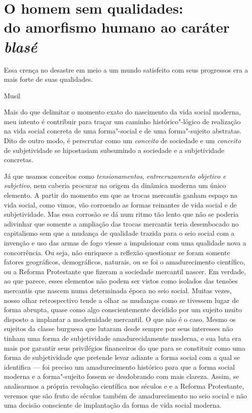\chapter*{O homem sem qualidades:\\ do amorfismo humano ao caráter \emph{blasé}}

\epigraph{Essa crença no desastre em meio a um mundo satisfeito com seus
progressos era a mais forte de suas qualidades.}{Musil}

Mais do que delimitar o momento exato do nascimento da vida social
moderna, meu intento é contribuir para traçar um caminho
histórico"-lógico de realização na vida social concreta de uma forma"-social e de
uma forma"-sujeito abstratas. Dito de outro modo, é perscrutar como um
\emph{conceito} de sociedade e um \emph{conceito} de subjetividade se
hipostasiam subsumindo a sociedade e a subjetividade concretas.

Já que usamos conceitos como \emph{tensionamentos},
\emph{entrecruzamento objetivo e subjetivo}, nem caberia procurar na
origem da dinâmica moderna um único elemento. A partir do momento em que
as trocas mercantis ganham espaço na vida social, como vimos, vão
corroendo as formas reinantes de vida social e de subjetividade. Mas
essa corrosão se dá num ritmo tão lento que não se poderia adivinhar que
somente a ampliação das trocas mercantis teria desembocado no
capitalismo sem que a mudança de qualidade trazida para o seio social
com a invenção e uso das armas de fogo viesse a impulsionar com uma
qualidade nova a concorrência. Ou seja, não enriquece a reflexão questionar
se foram somente fatores geográficos, demográficos, naturais, ou se
foi o amadurecimento científico, ou a Reforma Protestante que fizeram a
sociedade mercantil nascer. Em verdade, ao que parece, esses elementos
não podem ser vistos como isolados das tensões mercantis que nascem numa
determinada época no seio social. Muitas vezes, nosso olhar
retrospectivo tende a olhar as mudanças como se tivessem lugar de forma
abrupta, quase como algo conscientemente decidido por um sujeito muito
disposto a implantar a modernidade mercantil. O que não é o caso. Mesmo
os sujeitos da classe burguesa que lutaram desde sempre por seus
interesses não tinham uma forma de subjetividade amadurecidamente
moderna, e sua luta era mais por garantir seus privilégios financeiros
do que para se constituir como uma forma de subjetividade que pretende
levar adiante a forma social com a qual se identifica --- foi preciso um
amadurecimento histórico para que a forma social moderna e a
forma"-sujeito fossem se desdobrando com mais clareza. Assim, se
analisarmos a própria revolução científica nos séculos  e  e a
Reforma Protestante, veremos que são fruto de séculos também de
amadurecimento no seio social e não uma decisão consciente de
implantação da forma de vida social moderna.

